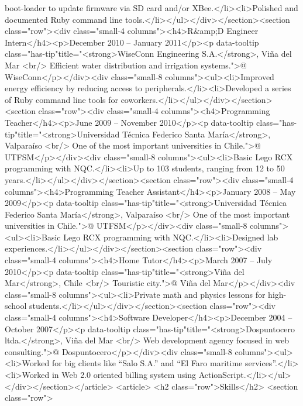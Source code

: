 boot-loader to update firmware via SD card and/or XBee.</li><li>Polished and documented Ruby command line tools.</li></ul></div></section><section class="row"><div class="small-4 columns"><h4>R&amp;D Engineer Intern</h4><p>December 2010 – January 2011</p><p data-tooltip class="has-tip"title="<strong>WiseConn Engineering S.A.</strong>, Viña del Mar <br/> Efficient water distribution and irrigation systems.">@ WiseConn</p></div><div class="small-8 columns"><ul><li>Improved energy efficiency by reducing access to peripherals.</li><li>Developed a series of Ruby command line tools for coworkers.</li></ul></div></section><section class="row"><div class="small-4 columns"><h4>Programming Teacher</h4><p>June 2009 – November 2010</p><p data-tooltip class="has-tip"title="<strong>Universidad Técnica Federico Santa María</strong>, Valparaíso <br/> One of the most important universities in Chile.">@ UTFSM</p></div><div class="small-8 columns"><ul><li>Basic Lego RCX programming with NQC.</li><li>Up to 103 students, ranging from 12 to 50 years.</li></ul></div></section><section class="row"><div class="small-4 columns"><h4>Programming Teacher Assistant</h4><p>January 2008 – May 2009</p><p data-tooltip class="has-tip"title="<strong>Universidad Técnica Federico Santa María</strong>, Valparaíso <br/> One of the most important universities in Chile.">@ UTFSM</p></div><div class="small-8 columns"><ul><li>Basic Lego RCX programming with NQC.</li><li>Designed lab experiences.</li></ul></div></section><section class="row"><div class="small-4 columns"><h4>Home Tutor</h4><p>March 2007 – July 2010</p><p data-tooltip class="has-tip"title="<strong>Viña del Mar</strong>, Chile <br/> Touristic city.">@ Viña del Mar</p></div><div class="small-8 columns"><ul><li>Private math and physics lessons for high-school students.</li></ul></div></section><section class="row"><div class="small-4 columns"><h4>Software Developer</h4><p>December 2004 – October 2007</p><p data-tooltip class="has-tip"title="<strong>Dospuntocero ltda.</strong>, Viña del Mar <br/> Web development agency focused in web consulting.">@ Dospuntocero</p></div><div class="small-8 columns"><ul><li>Worked for big clients like “Salo S.A.” and “El Faro maritime services”.</li><li>Worked in Web 2.0 oriented billing system using ActionScript.</li></ul></div></section></article>
    <article>
        <h2 class="row">Skills</h2>
        <section class="row">
        
